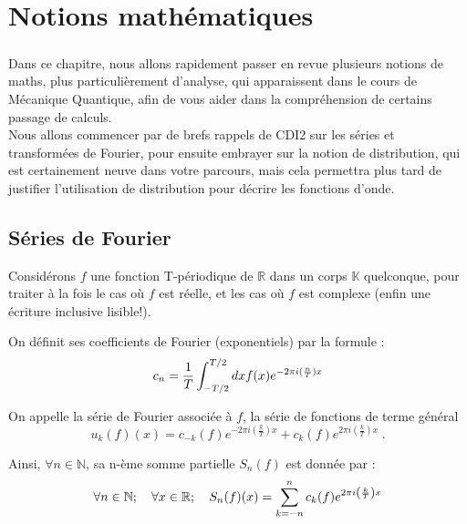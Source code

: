 \documentclass[../notesdecours.tex]{subfiles}
\begin{document}
    
\chapter{Notions mathématiques}

\paragraph{} Dans ce chapitre, nous allons rapidement passer en revue plusieurs notions de maths, 
plus particulièrement d'analyse, qui apparaissent dans le cours de Mécanique Quantique, 
afin de vous aider dans la compréhension de certains passage de calculs. \\

Nous allons commencer par de brefs rappels de CDI2 sur les séries et transformées de Fourier, 
pour ensuite embrayer sur la notion de distribution, qui est certainement neuve dans votre parcours,
mais cela permettra plus tard de justifier l'utilisation de distribution pour décrire les fonctions d'onde. \\

\section{Séries de Fourier}
Considérons $f$ une fonction T-périodique de $\mathbb{R}$ dans un corps $\mathbb{K}$ quelconque, pour traiter à la fois le cas où $f$ est réelle, et les cas où $f$ est complexe (enfin une écriture inclusive lisible!).\\

\begin{definition}
    On définit ses coefficients de Fourier (exponentiels) par la formule : 
\begin{equation}
c_n = \frac{1}{T} \int^{T/2}_{-T/2} dx f(x)e^{-2\pi i(\frac{n}{T})x} \\
\end{equation}
\end{definition}

\begin{definition}
    On appelle la série de Fourier associée à $f$, la série de fonctions de terme général 
    $$u_k(f) (x) = c_{-k}(f) e^{-2\pi i \left(\frac{k}{T}\right) x} + c_{k}(f) e^{2\pi i \left(\frac{k}{T}\right) x}\; .$$
    
Ainsi, $\forall n \in \mathbb{N}$, sa n-ème somme partielle $S_n(f)$ est donnée par :
\begin{equation}
    \forall n\in \mathbb{N} ; \quad \forall x \in \mathbb{R} ;  \quad S_n(f)(x) = \sum_{k=-n}^{n} c_k(f) e^{2\pi i \left( \frac{k}{T} \right) x} \\
\end{equation}
\end{definition}
\end{document}
